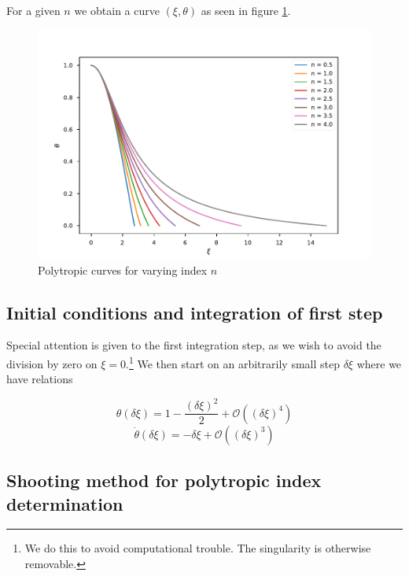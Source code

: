 \documentclass{aa}
\begin{document}
For a given $n$ we obtain a curve $(\xi, \theta)$ as seen in figure \ref{fig:poly_ex}.

\begin{figure}
  \centering
  \includegraphics[width=\linewidth]{../figures/poly.pdf}
  \caption{Polytropic curves for varying index $n$}
  \label{fig:poly_ex}
\end{figure}

\subsection{Initial conditions and integration of first step}

Special attention is given to the first integration step, as we wish to avoid
the division by zero on $\xi = 0$.\footnote{We do this to avoid computational
  trouble. The singularity is otherwise removable.} We then start on an
arbitrarily small step $\delta \xi$ where we have relations 

\begin{equation}
  \label{eq:initial_cond_1}
  \theta(\delta \xi) = 1 - \frac{(\delta \xi)^2}{2} + \mathcal{O}\left((\delta \xi)^4\right)
\end{equation}
\begin{equation}
  \label{eq:initial_cond_2}
  \dot{\theta}(\delta \xi) = -\delta \xi + \mathcal{O}\left( (\delta \xi)^3 \right)
\end{equation}

\subsection{Shooting method for polytropic index determination}
\end{document}
